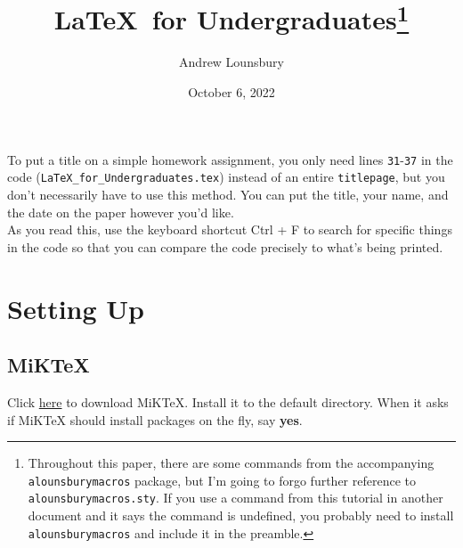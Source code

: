 \documentclass{article} 		%
\begin{document}
\begin{titlepage}
	\title{\bfseries \LaTeX\ for Undergraduates\footnote{
			Throughout this paper, there are some commands from the accompanying \texttt{alounsburymacros} package, but I'm going to forgo further reference to \texttt{alounsburymacros.sty}. If you use a command from this tutorial in another document and it says the command is undefined, you probably need to install \texttt{alounsburymacros} and include it in the preamble. 
		}
	}
	\author{Andrew Lounsbury}
	\date{October 6, 2022}
	\maketitle
	
	\vspace{1.5in}
	To put a title on a simple homework assignment, you only need lines \texttt{31}-\texttt{37} in the code (\texttt{LaTeX\_for\_Undergraduates.tex}) instead of an entire \texttt{titlepage}, but you don't necessarily have to use this method. You can put the title, your name, and the date on the paper however you'd like. \\

	As you read this, use the keyboard shortcut Ctrl + F to search for specific things in the code so that you can compare the code precisely to what's being printed. 
\end{titlepage}

\tableofcontents

\newpage
\section{Setting Up} \label{sec:setting-up}
\subsection{MiKTeX} \label{subsec:miktex}
Click \href{https://miktex.org/download}{here} to download MiKTeX. Install it to the default directory. When it asks if MiKTeX should install packages on the fly, say \textbf{yes}.
\end{document}
